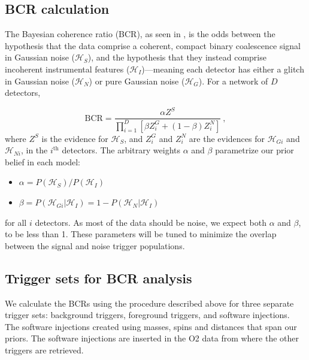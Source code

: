 \documentclass[%
 reprint,
 amsmath,amssymb,
 aps,
]{revtex4}
\begin{document}
\hypertarget{bcrCalculation}{%
\subsection{BCR calculation}\label{bcrCalculation}}

The Bayesian coherence ratio (BCR), as seen in \citet{bcr_paper}, is the odds between the hypothesis that the data comprise a
coherent, compact binary coalescence signal in Gaussian noise (\(\mathcal{H}_S\)), and the hypothesis that they instead
comprise incoherent instrumental features (\(\mathcal{H}_I\))---meaning each detector has either a glitch in Gaussian noise
(\(\mathcal{H}_N\)) or pure Gaussian noise (\(\mathcal{H}_G\)). For a network of \(D\) detectors,

\begin{equation}
\mathrm{BCR} = \frac{\alpha Z^{S}}{\prod_{i=1}^{D}\left[\beta Z_{i}^{G}+(1-\beta) Z_{i}^{N}\right]}\ , \label{eq:bcr}
\end{equation}
where \(Z^S\) is the evidence for \(\mathcal{H}_S\), and \(Z^{G}_i\) and
\(Z^N_i\) are the evidences for \(\mathcal{H}_{Gi}\) and \(\mathcal{H}_{Ni}\),
in the \(i^{\text{th}}\) detectors. The arbitrary weights \(\alpha\) and \(\beta\)
parametrize our prior belief in each model:

\begin{itemize}
\item
  \(\alpha = P(\mathcal{H}_S)/P(\mathcal{H}_I)\)
\item
  \(\beta = P(\mathcal{H}_{Gi}|\mathcal{H}_I)=1-P(\mathcal{H}_{N}|\mathcal{H}_I)\)
\end{itemize}

for all \(i\) detectors. As most of the data should be noise, we expect both \(\alpha\) and \(\beta\), to be less than 1.
These parameters will be tuned to minimize the overlap between the signal and noise trigger populations.

\hypertarget{trigger-sets-for-bcr-analysis}{%
\subsection{Trigger sets for BCR analysis}\label{trigger-sets-for-bcr-analysis}}

We calculate the BCRs using the procedure described above for three separate trigger sets: background triggers,
foreground triggers, and software injections. The software injections created using masses, spins and distances that
span our priors. The software injections are inserted in the O2 data from where the other triggers are retrieved.
\end{document}
